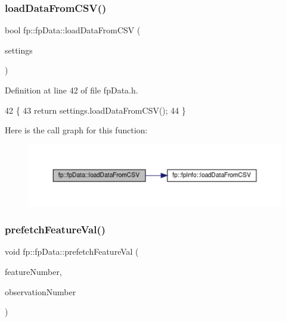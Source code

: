 \subsubsection{\texorpdfstring{load\+Data\+From\+C\+S\+V()}{loadDataFromCSV()}}
{\footnotesize\ttfamily bool fp\+::fp\+Data\+::load\+Data\+From\+C\+SV (\begin{DoxyParamCaption}\item[{\hyperlink{classfp_1_1fpInfo}{fp\+Info} \&}]{settings }\end{DoxyParamCaption})\hspace{0.3cm}{\ttfamily [inline]}}



Definition at line 42 of file fp\+Data.\+h.


\begin{DoxyCode}
42                                                          \{
43                 \textcolor{keywordflow}{return} settings.loadDataFromCSV();
44             \}
\end{DoxyCode}
Here is the call graph for this function\+:\nopagebreak
\begin{figure}[H]
\begin{center}
\leavevmode
\includegraphics[width=350pt]{classfp_1_1fpData_a2b4d9be328aaa7acf9a2561150da0402_cgraph}
\end{center}
\end{figure}
\mbox{\label{classfp_1_1fpData_a3f9645ca93e9b64a788b3042e9e41fcc}} 
\subsubsection{\texorpdfstring{prefetch\+Feature\+Val()}{prefetchFeatureVal()}}
{\footnotesize\ttfamily void fp\+::fp\+Data\+::prefetch\+Feature\+Val (\begin{DoxyParamCaption}\item[{const int}]{feature\+Number,  }\item[{const int}]{observation\+Number }\end{DoxyParamCaption})\hspace{0.3cm}{\ttfamily [inline]}}



